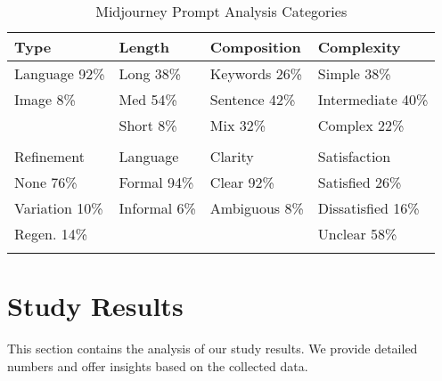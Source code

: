 \begin{table}[]
    \centering
    \caption{Midjourney Prompt Analysis Categories}
    \begin{tabular}{@{}llll@{}}
        \toprule
        Type                    & Length                & Composition           & Complexity   \\ \midrule
        Language \hfill 92\%    & Long \hfill 38\%      & Keywords \hfill 26\% & Simple  \hfill
        38\%     \\
        Image   \hfill 8\%     & Med \hfill 54\%        & Sentence \hfill 42\%      &
        Intermediate \hfill 40\% \\
                                & Short \hfill 8\%      &  Mix \hfill 32\%          & Complex \hfill 22\%     \\
        \\
        \toprule
        Refinement          & Language & Clarity & Satisfaction \\
        \midrule
        None \hfill 76\% & Formal \hfill 94\%       & Clear \hfill 92\%     & Satisfied \hfill 26\% \\
        Variation \hfill 10\% & Informal \hfill 6\% & Ambiguous  \hfill 8\% & Dissatisfied \hfill 16\% \\
        Regen. \hfill 14\% & & & Unclear \hfill 58\% \\\\
        \bottomrule
    \end{tabular}
    \label{tab:midjourney-prompt-analysis-categories}
\end{table}

\section{Study Results}
\label{sec:study-results}
This section contains the analysis of our study results.
We provide detailed numbers and offer insights based on the collected data.
